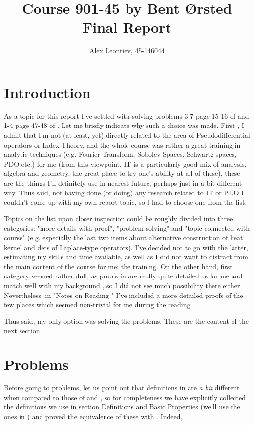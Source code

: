 \documentclass[10pt]{article} %
\title{Course 901-45 by Bent Ørsted\\Final Report}
\author{Alex Leontiev, 45-146044}
\begin{document}
\begin{CJK}{UTF8}{bsmi}
\maketitle
\end{CJK}
\section{Introduction}
As a topic for this report I've settled with solving problems 3-7 page 15-16 of \cite{met-sobolev}
and 1-4 page 47-48 of \cite{met-fa}. Let me briefly indicate why such a choice was made. First
, I admit that I'm not (at least, yet) directly related to the area of Pseudodifferential operators or Index Theory, and the whole
course was rather a great training in analytic techniques (e.g. Fourier Transform, Sobolev Spaces, Schwartz spaces, PDO etc.) for me
(from this viewpoint, IT is a particularly good mix of analysis, algebra and geometry, the great place to try one's ability at all
of these), these are the things I'll definitely use in nearest future, perhaps just in a bit different way. Thus said, not having
done (or doing) any research related to IT or PDO I couldn't come up with my own report topic, so I had to choose one from the list.

Topics on the list upon closer inspection could be roughly divided into three categories: "more-details-with-proof", "problem-solving"
and "topic connected with course" (e.g. especially the last two items about alternative construction of heat kernel and dets of
Laplace-type operators). I've decided not to go with the latter, estimating my skills and time available, as well as I did not want
to distract from the main content of the course for me: the training. On the other hand, first category seemed rather dull, as
proofs in \cite{gilkey} are really quite detailed as for me and match well with my background
, so I did not see much possibility there either. Nevertheless, in "Notes
on Reading \cite{gilkey}" I've included a more detailed proofs of the few places which seemed non-trivial for me during the reading.

Thus said, my only option was solving the problems. These are the content of the next section.
\section{Problems}
Before going to problems, let us point out that definitions in \cite{gilkey} are {\it a bit} different when compared to those
of \cite{met-sobolev} and \cite{met-fa}, so for completeness we have explicitly 
collected the definitions we use in section Definitions and
Basic Properties (we'll use the ones in \cite{gilkey}) and proved the equivalence of these with \cite{gilkey}.
Indeed, 
\end{document}

